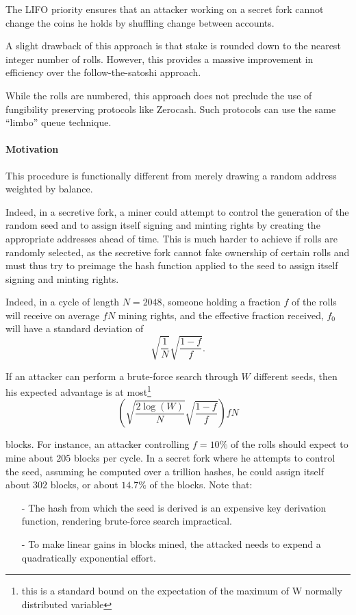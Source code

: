 \documentclass[letterpaper]{article}
\begin{document}
The LIFO priority ensures that an attacker working on a secret fork cannot
change the coins he holds by shuffling change between accounts.

A slight drawback of this approach is that stake is rounded down to the
nearest integer number of rolls. However, this provides a massive improvement
in efficiency over the follow-the-satoshi approach.

While the rolls are numbered, this approach does not preclude the use of 
fungibility preserving protocols like Zerocash. Such protocols can use
the same ``limbo'' queue technique.

\paragraph{Motivation}
This procedure is functionally different from merely drawing a random address
weighted by balance.

Indeed, in a secretive fork, a miner could attempt to control the generation of
the random seed and to assign itself signing and minting rights by creating the
appropriate addresses ahead of time. This is much harder to achieve if rolls
are randomly selected, as the secretive fork cannot fake ownership of certain
rolls and must thus try to preimage the hash function applied to the seed to
assign itself signing and minting rights. 

Indeed, in a cycle of length $N=\num{2048}$, someone holding a fraction $f$ of
the rolls will receive on average $f N$ mining rights, and the effective
fraction received, $f_0$ will have a standard deviation of
$$\sqrt{\frac{1}{N}}\sqrt{\frac{1-f}{f}}.$$

If an attacker can perform a brute-force search through $W$ different seeds,
then his expected advantage is at most\footnote{this is a standard bound
on the expectation of the maximum of W normally distributed variable}
$$\left(\sqrt{\frac{2\log(W)}{N}}\sqrt{\frac{1-f}{f}}\right)fN$$

blocks. For instance, an attacker controlling $f = 10\%$ of the rolls should
expect  to mine about $205$ blocks per cycle. In a secret fork where he attempts
to control the seed, assuming he computed over a trillion hashes, he could
assign itself about $302$ blocks, or about $14.7\%$ of the blocks. Note that:
\begin{itemize}
\item[-] The hash from which the seed is derived is an expensive key derivation
function, rendering brute-force search impractical.
\item[-] To make linear gains in blocks mined, the attacked needs to expend a
quadratically exponential effort.
\end{itemize}  
\end{document}
